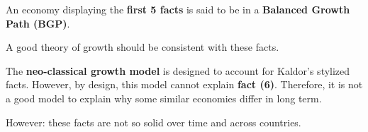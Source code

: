 An economy displaying the \textbf{first 5 facts} is said to be in a \textbf{Balanced Growth Path (BGP)}.

A good theory of growth should be consistent with these facts.

The \textbf{neo-classical growth model} is designed to account for Kaldor's stylized facts. However, by design, this model cannot explain \textbf{fact (6)}. Therefore, it is not a good model to explain why some similar economies differ in long term.

\begin{remark*} However:
    these facts are not so solid over time and across countries.
\end{remark*}
